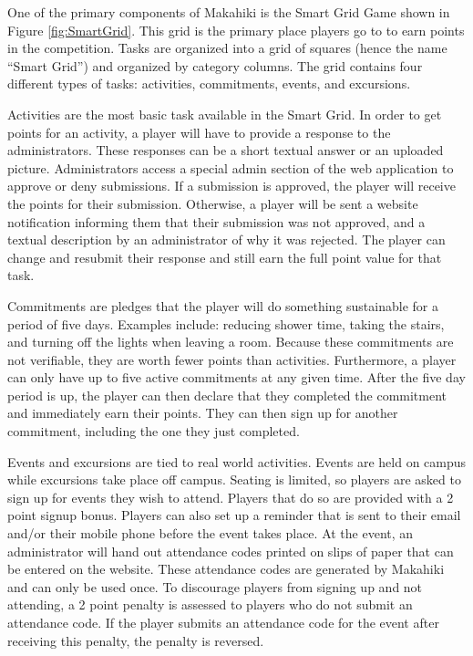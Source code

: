 \documentclass{acm_proc_article-sp}
\begin{document}
One of the primary components of Makahiki is the Smart Grid Game shown in Figure \ref{fig:SmartGrid}. This grid is the primary place players go to to earn points in the competition. Tasks are organized into a grid of squares (hence the name ``Smart Grid'') and organized by category columns. The grid contains four different types of tasks: activities, commitments, events, and excursions.

Activities are the most basic task available in the Smart Grid. In order to get points for an activity, a player will have to provide a response to the administrators. These responses can be a short textual answer or an uploaded picture. Administrators access a special admin section of the web application to approve or deny submissions. If a submission is approved, the player will receive the points for their submission. Otherwise, a player will be sent a website notification informing them that their submission was not approved, and a textual description by an administrator of why it was rejected. The player can change and resubmit their response and still earn the full point value for that task.

Commitments are pledges that the player will do something sustainable for a period of five days. Examples include: reducing shower time, taking the stairs, and turning off the lights when leaving a room. Because these commitments are not verifiable, they are worth fewer points than activities. Furthermore, a player can only have up to five active commitments at any given time. After the five day period is up, the player can then declare that they completed the commitment and immediately earn their points. They can then sign up for another commitment, including the one they just completed.

Events and excursions are tied to real world activities. Events are held on campus while excursions take place off campus. Seating is limited, so players are asked to sign up for events they wish to attend. Players that do so are provided with a 2 point signup bonus. Players can also set up a reminder that is sent to their email and/or their mobile phone before the event takes place. At the event, an administrator will hand out attendance codes printed on slips of paper that can be entered on the website. These attendance codes are generated by Makahiki and can only be used once. To discourage players from signing up and not attending, a 2 point penalty is assessed to players who do not submit an attendance code. If the player submits an attendance code for the event after receiving this penalty, the penalty is reversed.
\end{document}
